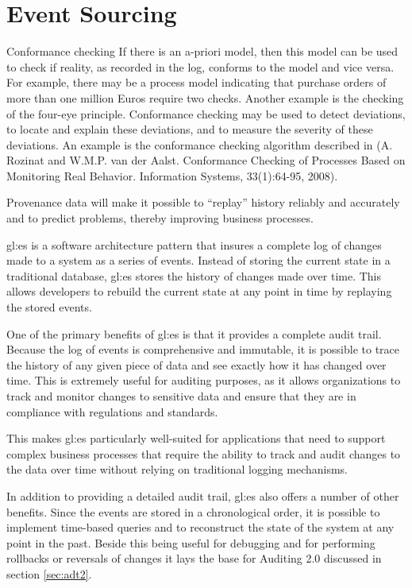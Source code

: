 %
\chapter{Event Sourcing}\label{chap:es}

Conformance checking
If there is an a-priori model, then this model can be used to check if reality, as recorded in the log,
conforms to the model and vice versa. For example, there may be a process model indicating that
purchase orders of more than one million Euros require two checks. Another example is the checking of
the four-eye principle. Conformance checking may be used to detect deviations, to locate and explain
these deviations, and to measure the severity of these deviations. An example is the conformance
checking algorithm described in (A. Rozinat and W.M.P. van der Aalst. Conformance Checking of
Processes Based on Monitoring Real Behavior. Information Systems, 33(1):64-95, 2008).

Provenance data will make it possible to “replay” history reliably and accurately and to predict problems, thereby improving business processes.

\gls{gl:es} is a software architecture pattern that insures a complete log of changes made to a system as a series of events. Instead of storing the current state in a traditional database, \gls{gl:es} stores the history of changes made over time. This allows developers to rebuild the current state at any point in time by replaying the stored events.

One of the primary benefits of \gls{gl:es} is that it provides a complete audit trail. Because the log of events is comprehensive and immutable, it is possible to trace the history of any given piece of data and see exactly how it has changed over time. This is extremely useful for auditing purposes, as it allows organizations to track and monitor changes to sensitive data and ensure that they are in compliance with regulations and standards.

This makes \gls{gl:es} particularly well-suited for applications that need to support complex business processes that require the ability to track and audit changes to the data over time without relying on traditional logging mechanisms.

In addition to providing a detailed audit trail, \gls{gl:es} also offers a number of other benefits. Since the events are stored in a chronological order, it is possible to implement time-based queries and to reconstruct the state of the system at any point in the past. Beside this being useful for debugging and for performing rollbacks or reversals of changes it lays the base for Auditing 2.0 discussed in section \ref{sec:adt2}.

